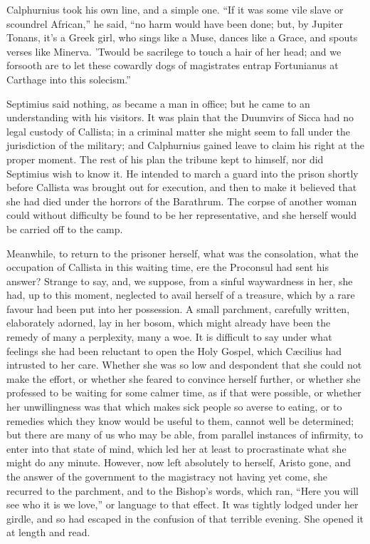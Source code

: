 Calphurnius took his own line, and a simple one. ``If it was
some vile slave or scoundrel African,'' he said, ``no harm
would have been done; but, by Jupiter Tonans, it's a Greek girl, who
sings like a Muse, dances like a Grace, and spouts verses like
Minerva. 'Twould be sacrilege to touch a hair of her head; and we
forsooth are to let these cowardly dogs of magistrates entrap
Fortunianus at Carthage into this solecism.''

Septimius said nothing, as became a man in office; but he came to
an understanding with his visitors. It was plain that the Duumvirs of
Sicca had no legal custody of Callista; in a criminal matter she might
seem to fall under the jurisdiction of the military; and Calphurnius
gained leave to claim his right at the proper moment. The rest of his
plan the tribune kept to himself, nor did Septimius wish to know it.
He intended to march a guard into the prison shortly before Callista
was brought out for execution, and then to make it believed that she
had died under the horrors of the Barathrum. The corpse of another
woman could without difficulty be found to be her representative, and
she herself would be carried off to the camp.

Meanwhile, to return to the prisoner herself, what was the
consolation, what the occupation of Callista in this waiting time, ere
the Proconsul had sent his answer? Strange to say, and, we suppose,
from a sinful waywardness in her, she had, up to this moment,
neglected to avail herself of a treasure, which by a rare favour had
been put into her possession. A small parchment, carefully written,
elaborately adorned, lay in her bosom, which might already have been
the remedy of many a perplexity, many a woe. It is difficult to say
under what feelings she had been reluctant to open the Holy Gospel,
which Cæcilius had intrusted to her care. Whether she was so low
and despondent that she could not make the effort, or whether
she feared to convince herself further, or whether she professed to be
waiting for some calmer time, as if that were possible, or whether her
unwillingness was that which makes sick people so averse to eating, or
to remedies which they know would be useful to them, cannot well be
determined; but there are many of us who may be able, from parallel
instances of infirmity, to enter into that state of mind, which led
her at least to procrastinate what she might do any minute. However,
now left absolutely to herself, Aristo gone, and the answer of the
government to the magistracy not having yet come, she recurred to the
parchment, and to the Bishop's words, which ran, ``Here you will
see who it is we love,'' or language to that effect. It was
tightly lodged under her girdle, and so had escaped in the confusion
of that terrible evening. She opened it at length and read.

